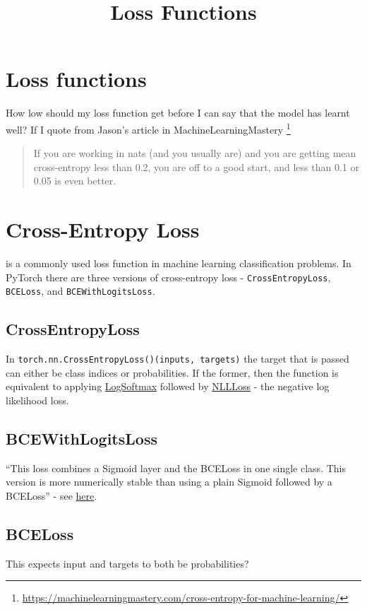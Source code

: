\documentclass{../template/texnote}
\title{Loss Functions}
\begin{document}
    \maketitle {}
\section{Loss functions}
How low should my loss function get before I can say that the model has learnt well?
If I quote from Jason's article in MachineLearningMastery  \footnote{\url{https://machinelearningmastery.com/cross-entropy-for-machine-learning/}}
\begin{quote}
If you are working in nats (and you usually are) and you are getting mean cross-entropy less than 0.2, you are off to a good start, and less than 0.1 or 0.05 is even better.
\end{quote}

\section{Cross-Entropy Loss}
 is a commonly used loss function in machine learning classification problems.
In PyTorch there are three versions of cross-entropy loss - \texttt{CrossEntropyLoss}, \texttt{BCELoss}, and \texttt{BCEWithLogitsLoss}.
\subsection{CrossEntropyLoss}
In \texttt{torch.nn.CrossEntropyLoss()(inputs, targets)} the target that is passed can 
either be class indices or probabilities.
If the former, then the function is equivalent to applying \href{https://docs.pytorch.org/docs/stable/generated/torch.nn.LogSoftmax.html\#torch.nn.LogSoftmax}{LogSoftmax} followed by \href{https://docs.pytorch.org/docs/stable/generated/torch.nn.NLLLoss.html\#torch.nn.NLLLoss}{NLLLoss} - the negative log likelihood loss.
\subsection{BCEWithLogitsLoss}
``This loss combines a Sigmoid layer and the BCELoss in one single class. This version is more numerically stable than using a plain Sigmoid followed by a BCELoss'' - see \href{https://docs.pytorch.org/docs/stable/generated/
torch.nn.BCEWithLogitsLoss.html\#torch.nn.BCEWithLogitsLoss}{here}.
\subsection{BCELoss}
This expects input and targets to both be probabilities?
    \printbibliography
\end{document}
